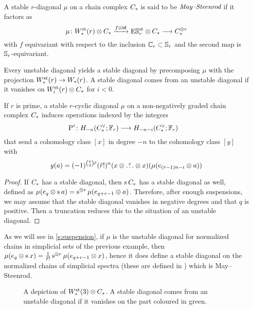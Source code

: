 \begin{definition}
	A stable $r$-diagonal $\mu$ on a chain complex $\ucadenas$ is said to be $\emph{May--Steenrod}$ if it factors as
	\[
	\mu \colon \Wst(r) \ot \ucadenas \xra{f \ot \id} \ESst_r \ot \ucadenas \lra \ucadenas^{\ot r}
	\]
	with $f$ equivariant with respect to the inclusion $\Cyc_r \subset \Sym_r$ and the second map is $\Sym_r$-equivariant.
\end{definition}

Every unstable diagonal yields a stable diagonal by precomposing $\mu$ with the projection $\Wst(r) \to \W(r)$.
A stable diagonal comes from an unstable diagonal if it vanishes on $\Wst[i](r) \ot \ucadenas$ for $i<0$.

\begin{proposition}
	If $r$ is prime, a stable $r$-cyclic diagonal $\mu$ on a non-negatively graded chain complex $\ucadenas$ induces operations indexed by the integers
	\begin{align*}
		\power^{i} \colon H_{-n}(\ucocadenas;\mathbb{F}_r)& \lra H_{-n-i}(\ucocadenas;\mathbb{F}_r)
	\end{align*}
	that send a cohomology class $[x]$ in degree $-n$ to the cohomology class $[y]$ with
	\[
	y(a) = (-1)^{\binom{n}{2} \tilde{r}}(\tilde{r}!)^n(x \ot \overset{r}{\dots} \ot x)(\mu(e_{(r-1)n-i} \ot a))
	\]
\end{proposition}

\begin{proof}
	If $\ucadenas$ has a stable diagonal, then $\sus{} \ucadenas$ has a stable diagonal as well, defined as $\mu(e_q \ot \sus{} a) = \sus{\ot r}\mu(e_{q+r-1} \ot a)$.
	Therefore, after enough suspensions, we may assume that the stable diagonal vanishes in negative degrees and that $q$ is positive.
	Then a truncation reduces this to the situation of an unstable diagonal.
\end{proof}

\begin{example}
	As we will see in \cref{s:suspension}, if $\mu$ is the unstable diagonal for normalized chains in simplicial sets of the previous example, then $\mu(e_q \ot \sus{} x) = \frac{1}{\tilde{r}!}\sus{\ot r} \mu(e_{q+r-1} \ot x)$, hence it does define a stable diagonal on the normalized chains of simplicial spectra (these are defined in \cite{Gill2020}) which is May--Steenrod.
\end{example}

\begin{figure}
	
	\caption{A depiction of $\Wst(3) \ot \ucadenas$. A stable diagonal comes from an unstable diagonal if it vanishes on the part coloured in green.}
\end{figure}

